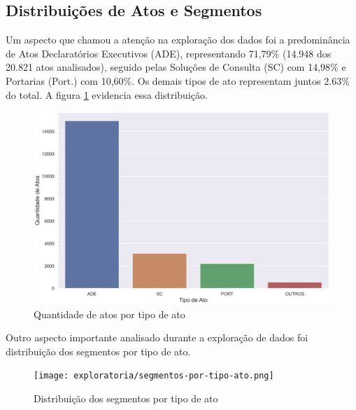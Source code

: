 \subsection{Distribuições de Atos e Segmentos}

Um aspecto que chamou a atenção na exploração dos dados foi a predominância de Atos Declaratórios Executivos (ADE), representando 71,79\% (14.948 dos 20.821 atos analisados), seguido pelas Soluções de Consulta (SC) com 14,98\% e Portarias (Port.) com 10,60\%. Os demais tipos de ato representam juntos 2.63\% do total. A figura \ref{fig:atos-por-tipo-ato} evidencia essa distribuição.

\begin{figure}[h]
	\caption{Quantidade de atos por tipo de ato}
	\center
	\label{fig:atos-por-tipo-ato}
	\includegraphics[scale=1.7]{exploratoria/atos-por-tipo-ato.png}
	\fdp
\end{figure}

Outro aspecto importante analisado durante a exploração de dados foi distribuição dos segmentos por tipo de ato.

 \begin{figure}[h]
	\caption{Distribuição dos segmentos por tipo de ato}
	\center
	\label{fig:segmentos-por-tipo-ato}
	\texttt{[image: exploratoria/segmentos-por-tipo-ato.png]}
	\fdp
\end{figure}


